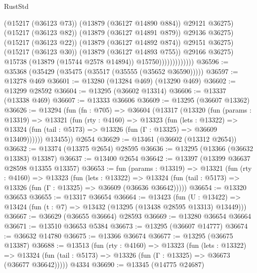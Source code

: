 \begin{lexlean}{RustStd}
\begin{coremodule}
                                      (@15217 (@36123 @73))
                                      (@13879 (@36127 @14890 @884))
                                      @29121
                                      @36275)
                                    (@15217 (@36123 @82))
                                    (@13879 (@36127 @14891 @879))
                                    @29136
                                    @36275)
                                  (@15217 (@36123 @22))
                                  (@13879 (@36127 @14892 @874))
                                  @29151
                                  @36275)
                                (@15217 (@36123 @30))
                                (@13879 (@36127 @14893 @755))
                                @29166
                                @36275)
                              @15738
                              (@13879 (@15744 @2578 @14894))
                              @15750)))))))))))))
@36596 := @35368 (@35429 (@35475 (@35517 (@35555 (@35652 @36590)))))
@36597 := @13278 @469
@36601 := @13280 (@13284 @469) (@13290 @469)
@36602 := @13299 @28592
@36604 := @13295 (@36602 @13314)
@36606 := @13337 (@13338 @469)
@36607 := @13333 @36606
@36609 := @13295 (@36607 @13362)
@36626 := @13294
    (fun (fn : @705) =>
    @36604
      (@13317
        (@13320
          (fun (params : @13319) =>
          @13321
            (fun (rty : @4160) =>
            @13323
              (fun (lets : @13322) =>
              @13324 (fun (tail : @5173) => @13326 (fun (Γ : @13325) => @36609 @13409))))))
        @13455))
    @2654
@36629 := @13461 (@36602 (@13312 @2654))
@36632 := @13374 (@13375 @2654) @28595
@36636 := @13295 (@13366 (@36632 @13383) @13387)
@36637 := @13400 @2654
@36642 := @13397 (@13399 @36637 @28598 @13355 @13357)
@36653 := fun (params : @13319) =>
  @13321
    (fun (rty : @4160) =>
    @13323
      (fun (lets : @13322) =>
      @13324 (fun (tail : @5173) => @13326 (fun (Γ : @13325) => @36609 (@36636 @36642)))))
@36654 := @13320 @36653
@36655 := @13317 @36654
@36664 := @13423
    (fun (U : @13422) => @13424 (fun (t : @7) => @13432 (@13295 (@13438 @28595 @13313) @13449)))
@36667 := @36629 (@36655 @36664) @28593
@36669 := @13280 @36654 @36664
@36671 := @13510 @36653 @5384
@36673 := @13295 (@36607 @14777)
@36674 := @36632 @14780
@36675 := @13366 @36674
@36677 := @13295 (@36675 @13387)
@36688 := @13513
    (fun (rty : @4160) =>
    @13323
      (fun (lets : @13322) =>
      @13324 (fun (tail : @5173) => @13326 (fun (Γ : @13325) => @36673 (@36677 @36642)))))
    @4334
@36690 := @13345 (@14775 @24687)

\end{coremodule}
\end{lexlean}
